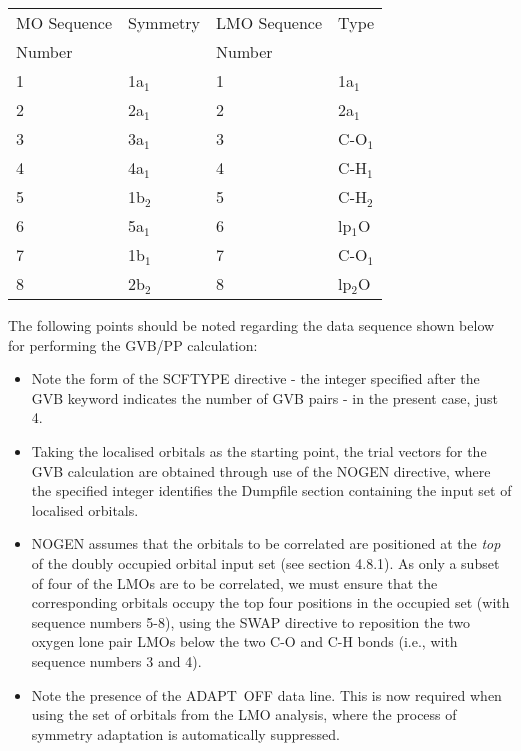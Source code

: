 \documentclass[11pt,fleqn]{article}
\begin{document}
 \begin{centering}
 \begin{tabular}{llll}
\\ \hline\hline
  MO Sequence  &   Symmetry &   LMO Sequence & Type \\ 
  Number &    & Number  &   \\ \hline
      1   &      1a$_{1}$    &     1   &      1a$_{1}$ \\
      2   &      2a$_{1}$    &     2   &      2a$_{1}$\\
      3   &      3a$_{1}$    &     3   &     C-O$_{1}$\\
      4   &      4a$_{1}$    &     4   &     C-H$_{1}$\\
      5   &      1b$_{2}$    &     5   &     C-H$_{2}$\\
      6   &      5a$_{1}$    &     6   &      lp$_{1}$O \\
      7   &      1b$_{1}$    &     7   &     C-O$_{1}$\\
      8   &      2b$_{2}$    &     8   &      lp$_{2}$O \\ 
\hline\hline
 \end{tabular}
 
 \end{centering}
\vspace{0.15in}
The following points should be noted regarding the
data sequence shown below for performing  the GVB/PP calculation:
\begin{itemize}
\item Note the form of the SCFTYPE
directive - the integer specified after the GVB
keyword indicates the number of GVB pairs - in the present
case, just 4.  
\item Taking the localised orbitals as the starting point,
the trial vectors for the GVB calculation
are obtained through use of the NOGEN directive, where the
specified integer identifies the Dumpfile section containing the
input set of localised orbitals. 
\item NOGEN assumes that the orbitals to be correlated are
positioned at the {\em top} of the doubly occupied orbital input set
(see section 4.8.1).
As only a subset of four of the LMOs are to be correlated, we must
ensure that the corresponding orbitals occupy the top 
four positions in the occupied set (with sequence
numbers 5-8), using the SWAP directive
to reposition the two oxygen lone pair LMOs below the
two C-O and C-H bonds (i.e., with sequence numbers 3 and 4).
\item Note the presence of the ADAPT~OFF data line. This is
now required when using the set of orbitals from the LMO
analysis, where the process of symmetry adaptation is
automatically suppressed.
\end{itemize}
\end{document}
